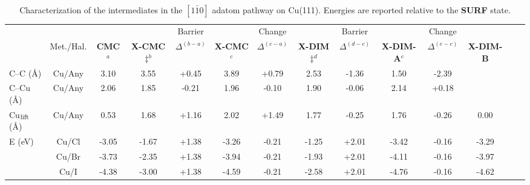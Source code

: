 \documentclass[aps,prl,reprint,amsmath,amssymb,floatfix,notitlepage]{revtex4-1}
\begin{document}
\begin{table*}
\centering
\caption{Characterization of the intermediates in the $[1\bar{1}0]$ adatom pathway on Cu(111). Energies are reported relative to the \textbf{SURF} state.}
\label{table:adatom-110}
\begin{tabular}{ lccccccccccccc  }
 \hline
 \hline
 & & & & Barrier & & Change & & Barrier & &Change&\\
 & Met./Hal. & \textbf{CMC}$^{a}$ & \textbf{X-CMC$\ddagger$}$^{b}$ & $\Delta^{(b-a)}$ & \textbf{X-CMC}$^{c}$ &$\Delta^{(c-a)}$ & \textbf{X-DIM$\ddagger$}$^{d}$ & $\Delta^{(d-c)}$ & \textbf{X-DIM-A}$^{e}$ &$\Delta^{(e-c)}$ & \textbf{X-DIM-B}  \\ 
 \hline 
 {C--C (\si{\angstrom})} & Cu/Any & {3.10} & {3.55} & {+0.45} & {3.89} &{+0.79} & {2.53} &{-1.36} & {1.50} &{-2.39}\\ 
 \hline
 {C--Cu (\si{\angstrom}) } & Cu/Any & {2.06} & {1.85} & {-0.21} & {1.96} &{-0.10} & {1.90} &{-0.06} & {2.14} &{+0.18} &{} \\ 
 \hline
 {Cu$_{\rm lift}$ (\si{\angstrom}) } & Cu/Any & {0.53} & {1.68} & {+1.16} & {2.02} &{+1.49} & {1.77} & {-0.25} & {1.76} &{-0.26} &{0.00}\\ 
 \hline
 \multirow{3}{*}{E (\si{\electronvolt}) } & Cu/Cl & -3.05 &-1.67 & +1.38 &-3.26 &-0.21 & -1.25 & +2.01& -3.42&-0.16&-3.29 \\ 
 & Cu/Br &-3.73 &-2.35 &+1.38 & -3.94 &-0.21 & -1.93 & +2.01 & -4.11 & -0.16&-3.97 \\ 
 & Cu/I  & -4.38 & -3.00 & +1.38 & -4.59 &-0.21 & -2.58& +2.01 & -4.76 & -0.16&-4.62\\ 
 \hline
 \hline
\end{tabular}
\end{table*}


\end{document}
